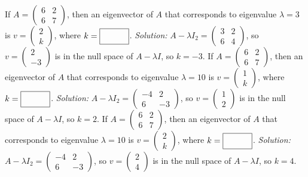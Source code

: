 \begin{parts}
    \fi 
    \ifnum {}
        If $A = \begin{pmatrix} 6&2\\6&7\end{pmatrix}$, then an eigenvector of $A$ that corresponds to eigenvalue $\lambda=3$ is $v = \begin{pmatrix} 2\\k\end{pmatrix}$, where $k = \framebox{\strut\hspace{1cm}}$.     
        \ifnum {} {\color{DarkBlue} \textit{Solution:} $A - \lambda I_2 = \begin{pmatrix} 3&2\\6&4\end{pmatrix}$, so $v = \begin{pmatrix} 2\\-3\end{pmatrix}$ is in the null space of $A - \lambda I$, so $k = -3$.} \fi    
    \fi 
    \ifnum {}
        If $A = \begin{pmatrix} 6&2\\6&7\end{pmatrix}$, then an eigenvector of $A$ that corresponds to eigenvalue $\lambda=10$ is $v = \begin{pmatrix} 1\\k\end{pmatrix}$, where $k = \framebox{\strut\hspace{1cm}}$.     
        \ifnum {} {\color{DarkBlue} \textit{Solution:} $A - \lambda I_2 = \begin{pmatrix} -4&2\\6&-3\end{pmatrix}$, so $v = \begin{pmatrix} 1\\2\end{pmatrix}$ is in the null space of $A - \lambda I$, so $k = 2$.} \fi
    \fi    
    \ifnum {}
        If $A = \begin{pmatrix} 6&2\\6&7\end{pmatrix}$, then an eigenvector of $A$ that corresponds to eigenvalue $\lambda=10$ is $v = \begin{pmatrix} 2\\k\end{pmatrix}$, where $k = \framebox{\strut\hspace{1cm}}$.     
        \ifnum {} {\color{DarkBlue} \textit{Solution:} $A - \lambda I_2 = \begin{pmatrix} -4&2\\6&-3\end{pmatrix}$, so $v = \begin{pmatrix} 2\\4\end{pmatrix}$ is in the null space of $A - \lambda I$, so $k = 4$.}

\end{parts}
